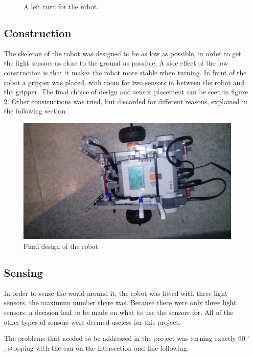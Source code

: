 \begin{figure}[H]

 \caption{A left turn for the robot.}
 \label{fig:left_turn}
\end{figure}

\subsection{Construction}
The skeleton of the robot was designed to be as low as possible, in order to get the light sensors as close to the ground as possible. A side effect of the low construction is that it makes the robot more stable when turning. In front of the robot a gripper was placed, with room for two sensors in between the robot and the gripper. The final choice of design and sensor placement can be seen in figure \ref{fig:final_robot}. Other constructions was tried, but discarded for different reasons, explained in the following section.

\begin{figure}[H]
\centering
 \includegraphics[scale = 0.1]{img/robot.jpg}
 \caption{Final design of the robot}
 \label{fig:final_robot}
\end{figure}

\subsection{Sensing}
In order to sense the world around it, the robot was fitted with three light sensors, the maximum number there was. Because there were only three light sensors, a decision had to be made on what to use the sensors for. All of the other types of sensors were deemed useless for this project.

The problems that needed to be addressed in the project was turning exactly 90 $^{\circ}$, stopping with the can on the intersection and line following.

